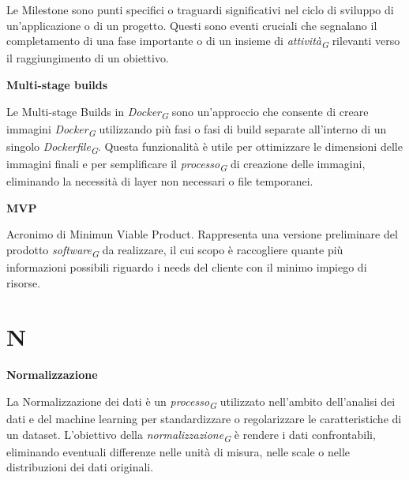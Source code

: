 \documentclass{article}
\begin{document}
\vspace{0.1cm}

Le Milestone sono punti specifici o traguardi significativi nel ciclo di sviluppo di un'applicazione o di un progetto. Questi sono eventi cruciali che segnalano il completamento di una fase importante o di un insieme di \textit{attività}\textsubscript{\textit{G}} rilevanti verso il raggiungimento di un obiettivo.

\vspace{0.4cm}

\textbf{Multi-stage builds}

\vspace{0.1cm}

Le Multi-stage Builds in \textit{Docker}\textsubscript{\textit{G}} sono un'approccio che consente di creare immagini \textit{Docker}\textsubscript{\textit{G}} utilizzando più fasi o fasi di build separate all'interno di un singolo \textit{Dockerfile}\textsubscript{\textit{G}}. Questa funzionalità è utile per ottimizzare le dimensioni delle immagini finali e per semplificare il \textit{processo}\textsubscript{\textit{G}} di creazione delle immagini, eliminando la necessità di layer non necessari o file temporanei.

\vspace{0.4cm}

\textbf{MVP}

\vspace{0.1cm}

Acronimo di Minimun Viable Product. Rappresenta una versione preliminare del prodotto \textit{software}\textsubscript{\textit{G}} da realizzare, il cui scopo è raccogliere quante più informazioni possibili riguardo i needs del cliente con il minimo impiego di risorse.

\pagebreak
\section*{N}
{}

\vspace{0.4cm}

\textbf{Normalizzazione}

\vspace{0.1cm}

La Normalizzazione dei dati è un \textit{processo}\textsubscript{\textit{G}} utilizzato nell'ambito dell'analisi dei dati e del machine learning per standardizzare o regolarizzare le caratteristiche di un dataset. L'obiettivo della \textit{normalizzazione}\textsubscript{\textit{G}} è rendere i dati confrontabili, eliminando eventuali differenze nelle unità di misura, nelle scale o nelle distribuzioni dei dati originali.
\end{document}
